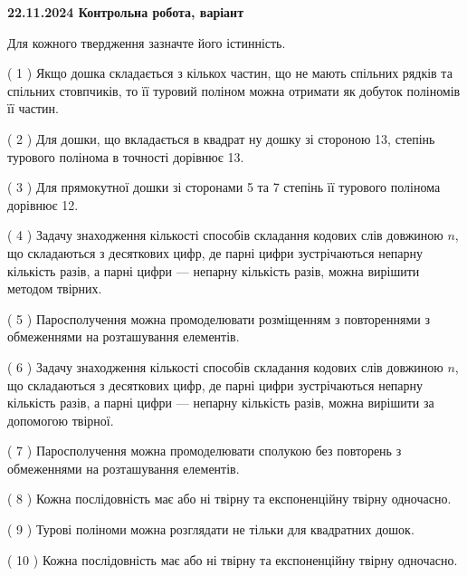 \documentclass[12pt, ukrainian]{article}
\begin{document}
\vspace{4mm}
\newpage
\begin {large}

\textbf{22.11.2024 Контрольна робота, варіант  }\par


{
Для кожного твердження зазначте його істинність.\par
\vspace{2mm}
( 1 ) Якщо дошка складається з кількох частин, що не мають спільних рядків та спільних стовпчиків, то її туровий поліном можна отримати як добуток поліномів її частин.%

( 2 ) Для дошки, що вкладається в квадрат ну дошку зі стороною 13, степінь турового полінома в точності дорівнює 13.%

( 3 ) Для прямокутної дошки зі сторонами 5 та 7 степінь її турового полінома дорівнює 12.%

( 4 ) Задачу знаходження кількості способів складання кодових слів довжиною $n$, що складаються з десяткових цифр, де парні цифри зустрічаються непарну кількість разів, а парні цифри — непарну кількість разів, можна вирішити методом твірних.%

( 5 ) Паросполучення можна промоделювати розміщенням з повтореннями з обмеженнями на розташування елементів.%

( 6 ) Задачу знаходження кількості способів складання кодових слів довжиною $n$, що складаються з десяткових цифр, де парні цифри зустрічаються непарну кількість разів, а парні цифри — непарну кількість разів, можна вирішити за допомогою твірної.%

( 7 ) Паросполучення можна промоделювати сполукою без повторень з обмеженнями на розташування елементів.%

( 8 ) Кожна послідовність має або ні твірну та експоненційну твірну одночасно.%

( 9 ) Турові поліноми можна розглядати не тільки для квадратних дошок.%

( 10 ) Кожна послідовність має або ні твірну та експоненційну твірну одночасно.%


\vspace{5mm}
}
\end {large}
\end{document}
